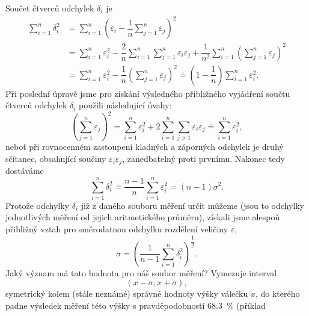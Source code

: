       Součet čtverců odchylek \(\delta_i\) je
      \begin{align*}
        \sum_{i=1}^{n}\delta_i^2 
          &= \sum_{i=1}^{n}\left(\varepsilon_i - 
             \dfrac{1}{n}\sum_{j=1}^{n}\varepsilon_j\right)^2 \\
          &= \sum_{i=1}^{n}\varepsilon_i^2 - 
             \dfrac{2}{n}\sum_{i=1}^{n}\sum_{j=1}^{n}\varepsilon_i\varepsilon_j + 
             \dfrac{1}{n^2}\sum_{i=1}^{n}\left(\sum_{j=1}^{n}\varepsilon_j\right)^2     \\
          &= \sum_{i=1}^{n}\varepsilon_i^2 - 
             \dfrac{1}{n}\left(\sum_{j=1}^{n}\varepsilon_j\right)^2                     
             \doteq \left(1 - \dfrac{1}{n}\right)\sum_{i=1}^{n}\varepsilon_i^2.
      \end{align*}
      Při poslední úpravě jsme pro získání výsledného přibližného vyjádření součtu čtverců odchylek
      \(\delta_i\) použili následující úvahy:
      \begin{equation*}
        \left(\sum_{j=1}^{n}\varepsilon_j\right)^2 = \sum_{i=1}^{n}\varepsilon_i^2 + 
        2\sum_{i=1}^{n}\sum_{j>1}\varepsilon_i\varepsilon_j \doteq \sum_{i=1}^{n}\varepsilon_i^2,
      \end{equation*}
      neboť při rovnocenném zastoupení kladných a záporných odchylek je druhý sčítanec, obsahující
      součiny \(\varepsilon_i\varepsilon_j\), zanedbatelný proti prvnímu. Nakonec tedy dostáváme
      \begin{equation*}
        \sum_{i=1}^{n}\delta_i^2 \doteq \dfrac{n-1}{n}\sum_{i=1}^{n}\varepsilon_i^2 = (n-1)\sigma^2.
      \end{equation*}
      Protože odchylky \(\delta_i\) již z daného souboru měření určit můžeme (jsou to odchylky 
      jednotlivých měření od jejich aritmetického průměru), získali jsme alespoň přibližný vztah 
      pro směrodatnou odchylku rozdělení veličiny \(\varepsilon\), 
      \begin{equation}\label{mai:eq074}
        \sigma = \left(\dfrac{1}{n-1}\sum_{i=1}^{n}\delta_i^2\right)^{\dfrac{1}{2}}.
      \end{equation}
      Jaký význam má tato hodnota pro náš soubor měření? Vymezuje interval
      \begin{equation*}
        (x - \sigma, x + \sigma),
      \end{equation*}
      symetrický kolem (stále neznámé) správné hodnoty výšky válečku \(x\), do kterého padne 
      výsledek měření této výšky s pravděpodobností \qty{68.3}{\percent} (příklad 
